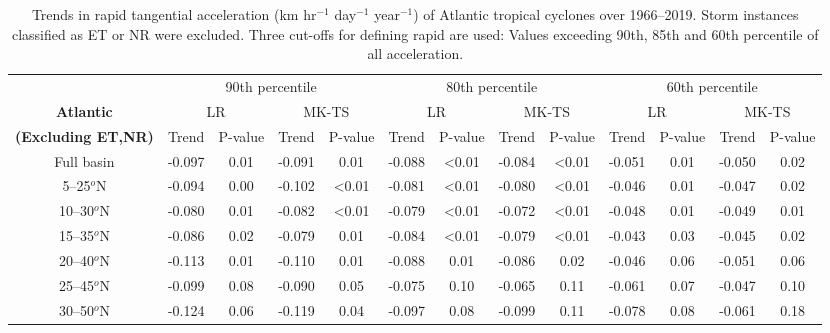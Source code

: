 \documentclass[wcd,manuscript]{copernicus}
\begin{document}
\begin{table*}[t]
  \caption{Trends in rapid tangential acceleration (km hr$^{-1}$ day$^{-1}$ year$^{-1}$) of Atlantic tropical cyclones over 1966--2019. Storm instances classified as ET or NR were excluded. Three cut-offs for defining rapid are used: Values exceeding 90th, 85th and 60th percentile of all acceleration. }

\begin{tabular}{|c|cccc|cccc|cccc|}
\hline
& \multicolumn{4}{|c|}{ 90th percentile } & \multicolumn{4}{|c|}{80th percentile }& \multicolumn{4}{|c|}{60th percentile}\\
\bf{Atlantic}  & \multicolumn{2}{c}{LR} & \multicolumn{2}{c|}{MK-TS}& \multicolumn{2}{c}{LR} & \multicolumn{2}{c|}{MK-TS} & \multicolumn{2}{c}{LR} &  \multicolumn{2}{c|}{MK-TS}\\
\bf{(Excluding ET,NR)} & Trend & P-value & Trend & P-value & Trend & P-value & Trend & P-value & Trend & P-value & Trend & P-value\\
\hline
Full basin  & -0.097 & 0.01 & -0.091 & 0.01 & -0.088 &  <0.01 & -0.084 &  <0.01 & -0.051 & 0.01 & -0.050 & 0.02 \\
	  5--25$^o$N & -0.094 & 0.00 & -0.102 & <0.01   & -0.081 & <0.01 & -0.080 & <0.01 & -0.046 & 0.01 & -0.047 & 0.02\\
	 10--30$^o$N & -0.080 & 0.01 & -0.082 & <0.01   & -0.079 & <0.01 & -0.072 & <0.01 & -0.048 & 0.01 & -0.049 & 0.01\\
	 15--35$^o$N & -0.086 & 0.02 & -0.079 & 0.01   & -0.084 & <0.01 & -0.079 & <0.01 & -0.043 & 0.03 & -0.045 & 0.02\\
	 20--40$^o$N & -0.113 & 0.01 & -0.110 & 0.01   & -0.088 & 0.01 & -0.086 & 0.02 & -0.046 & 0.06 & -0.051 & 0.06\\
	 25--45$^o$N & -0.099 & 0.08 & -0.090 & 0.05   & -0.075 & 0.10 & -0.065 & 0.11 & -0.061 & 0.07 & -0.047 & 0.10\\
	 30--50$^o$N & -0.124 & 0.06 & -0.119 & 0.04   & -0.097 & 0.08 & -0.099 & 0.11 & -0.078 & 0.08 & -0.061 & 0.18\\
\hline
\hline
\end{tabular}
\label{tab:atl_accelTrend}
\end{table*}




\end{document}
